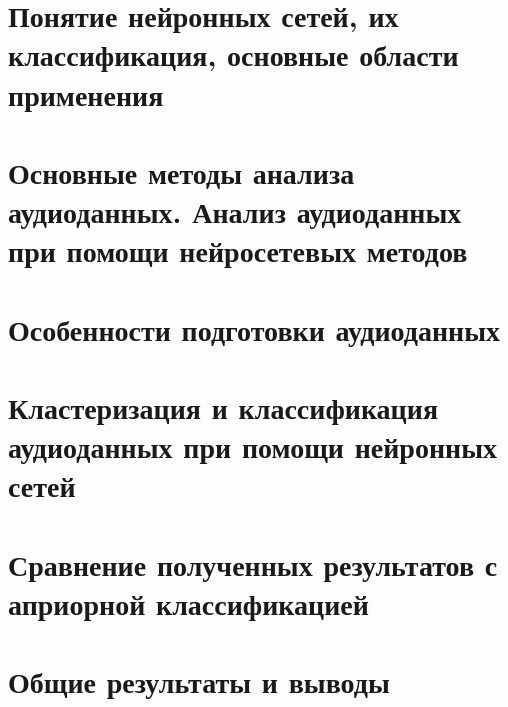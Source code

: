 \chapter{Понятие нейронных сетей, их классификация, основные области применения}
\chapter{Основные методы анализа аудиоданных. Анализ аудиоданных при помощи нейросетевых методов}
\chapter{Особенности подготовки аудиоданных}
\chapter{Кластеризация и классификация аудиоданных при помощи нейронных сетей}
\chapter{Сравнение полученных результатов с априорной классификацией}
\chapter{Общие результаты и выводы}